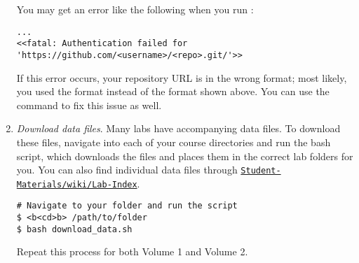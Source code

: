 \begin{enumerate}
    \begin{info}
    You may get an error like the following when you run :
\begin{lstlisting}
...
<<fatal: Authentication failed for 'https://github.com/<username>/<repo>.git/'>>
\end{lstlisting}
    If this error occurs, your repository URL is in the wrong format; most likely, you used the  format instead of the  format shown above.
    You can use the  command to fix this issue as well.
    \end{info}
    
    \item \emph{Download data files}.
    \label{step:download-data}
    Many labs have accompanying data files.
    To download these files, navigate into each of your course directories and run the  bash script, which downloads the files and places them in the correct lab folders for you.
    You can also find individual data files through \href{https://github.com/Foundations-of-Applied-Mathematics/Student-Materials/wiki/Lab-Index}{\texttt{Student-Materials/wiki/Lab-Index}}.
    
\begin{lstlisting}
# Navigate to your folder and run the script
$ <b<cd>b> /path/to/folder
$ bash download_data.sh
\end{lstlisting}
    Repeat this process for both Volume 1 and Volume 2.

\end{enumerate}
\fi
\fi
